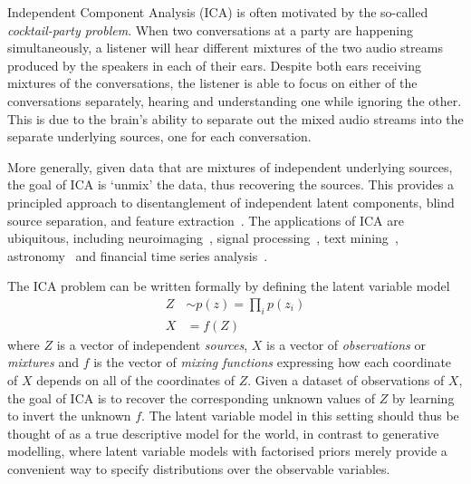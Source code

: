 Independent Component Analysis (ICA) is often motivated by the so-called \emph{cocktail-party problem}.
When two conversations at a party are happening simultaneously, a listener will hear different mixtures of the two audio streams produced by the speakers in each of their ears.
Despite both ears receiving mixtures of the conversations, the listener is able to focus on either of the conversations separately, hearing and understanding one while ignoring the other.
This is due to the brain's ability to separate out the mixed audio streams into the separate underlying sources, one for each conversation.

More generally, given data that are mixtures of independent underlying sources, the goal of ICA is `unmix' the data, thus recovering the sources.
This provides a principled approach to disentanglement of independent latent components, blind source separation, and feature extraction~\citep{hyvarinen2000independent}.
The applications of ICA are ubiquitous, including neuroimaging~\citep{mckeown1998independent}, signal processing~\citep{sawada2003direction}, text mining~\citep{honkela2010wordica}, astronomy~\citep{nuzillard2000blind} and financial time series analysis~\citep{oja2000independent}.

The ICA problem can be written formally by defining the 
latent variable model
%
\begin{align}
Z &\sim p(z) = \prod_i p(z_i) \label{eqn:ica-basic-1} \\
X &= f(Z) \label{eqn:ica-basic-2}
\end{align}
%
where $Z$ is a vector of independent \emph{sources}, $X$ is a vector of \emph{observations} or \emph{mixtures} and $f$ is the vector of \emph{mixing functions} expressing how each coordinate of $X$ depends on all of the coordinates of $Z$. 
Given a dataset of observations of $X$, the goal of ICA is to recover the corresponding unknown values of $Z$ by learning to invert the unknown $f$.
The latent variable model in this setting should thus be thought of as a true descriptive model for the world, 
in contrast to generative modelling, where latent variable models with factorised priors merely provide a convenient way to specify distributions over the observable variables. 


